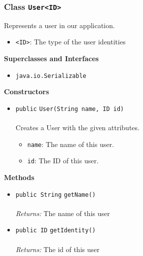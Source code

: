 \subsubsection{Class \lstinline|User<ID>|}
Represents a user in our application. \\
\noindent\begin{minipage}[t]{5cm}
\vspace{0.3em}
\hspace*{2em}
\vspace{0.3em}
\end{minipage}

\begin{itemize}
\item \lstinline|<ID>|: The type of the user identities
\end{itemize}


\textbf{\sffamily Superclasses and Interfaces}
\begin{itemize}
\item \lstinline|java.io.Serializable|
\end{itemize}


\textbf{\sffamily Constructors}
\begin{itemize}
\item \lstinline|public| \lstinline|User|\lstinline|(String name, ID id)|\\ \\[-0.6em]
Creates a User with the given attributes.
\begin{itemize}
\item \lstinline|name|: The name of this user.
\item \lstinline|id|: The ID of this user.
\end{itemize}



\end{itemize}


\textbf{\sffamily Methods}
\begin{itemize}
\item \lstinline|public String| \lstinline|getName|\lstinline|()|\\ \\[-0.6em]
\emph{Returns:} The name of this user



\item \lstinline|public ID| \lstinline|getIdentity|\lstinline|()|\\ \\[-0.6em]
\emph{Returns:} The id of this user



\end{itemize}

